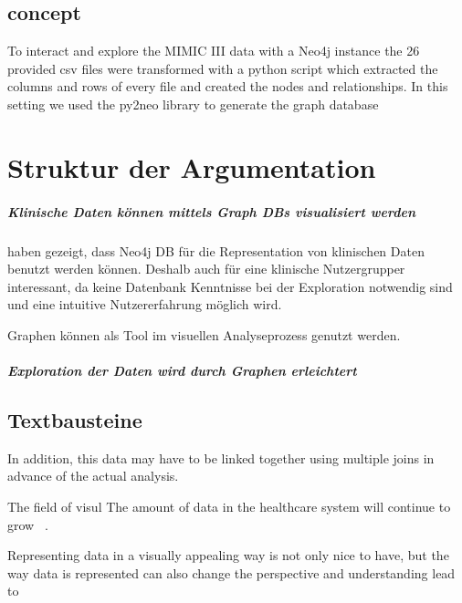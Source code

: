 \section{concept}
To interact and explore the MIMIC III data with a Neo4j instance the 26 provided csv files were transformed with a python script which extracted the columns and rows of every file and created the nodes and relationships. In this setting we used the py2neo library to generate the graph database 



\chapter{Struktur der Argumentation}

\paragraph{Klinische Daten können mittels Graph DBs visualisiert werden}
\cite{Stothers.2020} haben gezeigt, dass Neo4j DB für die Representation von klinischen Daten benutzt werden können. Deshalb auch für eine klinische Nutzergrupper interessant, da keine Datenbank Kenntnisse bei der Exploration notwendig sind und eine intuitive Nutzererfahrung möglich wird.

Graphen können als Tool im visuellen Analyseprozess genutzt werden. ~\cite{Landesberger.2011}


\paragraph{Exploration der Daten wird durch Graphen erleichtert}

\section{Textbausteine}

In addition, this data may have to be linked together using multiple joins in advance of the actual analysis. 

The field of visul The amount of data in the healthcare system will continue to grow ~\cite{Murdoch.2013}. 

Representing data in a visually appealing way is not only nice to have, but the way data is represented can also change the perspective and understanding  lead to 

